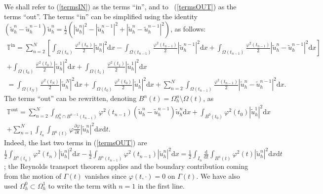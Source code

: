 \documentclass[11pt,a4paper]{article}
\theoremstyle{plain}
\theoremstyle{definition}
\theoremstyle{remark}
\numberwithin{equation}{section}
\newcommand{\dx}{\mathrm{d}x}
\newcommand{\dt}{\mathrm{d}t}
\begin{document}
We shall refer to (\ref{termsIN}) as the terms ``in'', and to \
(\ref{termsOUT}) as the terms ``out''. The terms ``in'' can be simplified
using the identity $(\tilde{u}_h^n - \tilde{u}_h^{n - 1})  \tilde{u}_h^n =
\frac{1}{2}  (| \tilde{u}_h^n |^2 - | \tilde{u}_h^{n - 1} |^2 + |
\tilde{u}_h^n - \tilde{u}_h^{n - 1} |^2)$, as follows:
\begin{multline} \label{eq:new in}
\mathbb{T}^{\text{in}}=
\sum_{n = 2}^N \left[ \int_{\Omega (t_n)} \frac{\varphi^2 (t_n)}{2} |
   \tilde{u}_h^n |^2 \dx - \int_{\Omega (t_{n - 1})} \frac{\varphi^2 (t_{n -
   1})}{2} | \tilde{u}_h^{n - 1} |^2 \dx + \int_{\Omega (t_{n - 1})}
   \frac{\varphi^2 (t_{n - 1})}{2} | \tilde{u}_h^n - \tilde{u}_h^{n - 1} |^2
   \dx \right] \\
 + \int_{\Omega (t_0)} \frac{\varphi^2 (t_0)}{2} | \tilde{u}_h^1 |^2 \dx +
   \int_{\Omega (t_1)} \frac{\varphi^2 (t_1)}{2} | \tilde{u}_h^1 |^2 \dx \\
= \int_{\Omega (t_N)} \frac{\varphi^2 (t_N)}{2} | \tilde{u}_h^N |^2 \dx +
   \int_{\Omega (t_0)} \frac{\varphi^2 (t_0)}{2} | \tilde{u}_h^1 |^2 \dx +
   \sum_{n = 2}^N \int_{\Omega (t_{n - 1})} \frac{\varphi^2 (t_{n - 1})}{2}  |
   \tilde{u}_h^n - \tilde{u}_h^{n - 1} |^2 \dx.
   \end{multline}
The terms ``out'' can be rewritten, denoting $B^n (t) = \Omega_h^n \setminus\Omega (t)$, as
\begin{multline} \label{eq:new out}
\mathbb{T}^{\text{out}}=
\sum_{n = 2}^N \int_{\Omega_h^n \cap B^{n - 1} (t_{n - 1})} \varphi^2 (t_{n -
   1})  (\tilde{u}_h^n - \tilde{u}_h^{n - 1})  \tilde{u}_h^n \dx +
   \int_{B^0 (t_0)} \varphi^2 (t_0) | \tilde{u}_h^1 |^2 \dx \\
 + \sum_{n = 1}^N \int_{I_n} \int_{B^n (t)} \varphi \frac{\partial
   \varphi}{\partial t} | \tilde{u}_h^n |^2 \dx \dt.
\end{multline}
Indeed, the last two terms in (\ref{termsOUT}) are
$\frac{1}{2}\int_{B^n(t_n)}\varphi^2(t_n)|\tilde u^n_h|^2\dx-\frac{1}{2}\int_{B^n(t_{n-1})}\varphi^2(t_{n-1})|\tilde u^n_h|^2\dx=\frac{1}{2}\int_{I_n} \frac{\mathrm{d}}{\dt}\int_{B^n (t)} \varphi^2(t)  | \tilde{u}_h^n |^2 \dx \dt$; the Reynolds transport theorem applies and the boundary contribution coming from the motion of $\Gamma(t)$ vanishes since $\varphi(t,\cdot)=0$ on $\Gamma(t)$. We have also used $\Omega_h^0\subset\Omega_h^1$ to write the term with $n=1$ in the first line.
\end{document}
